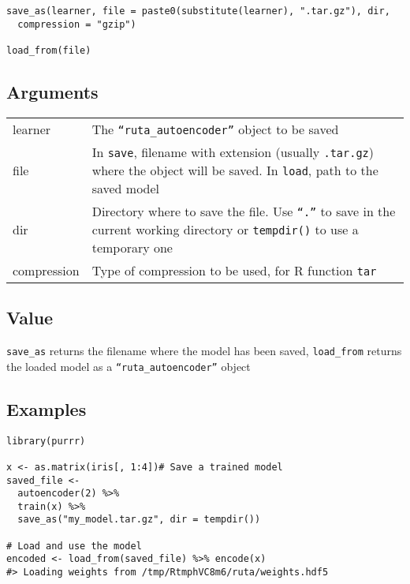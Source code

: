\begin{verbatim}
save_as(learner, file = paste0(substitute(learner), ".tar.gz"), dir,
  compression = "gzip")

load_from(file)
\end{verbatim}

\hypertarget{arguments}{\subsection{\texorpdfstring{\protect\hyperlink{arguments}{}Arguments}{Arguments}}\label{arguments}}

\begin{longtable}[c]{@{}>{\small}p{3cm}>{\raggedright}p{12.5cm}@{}}
\toprule
learner & The \texttt{``ruta\_autoencoder''} object to be
saved\tabularnewline
file & In \texttt{save}, filename with extension (usually
\texttt{.tar.gz}) where the object will be saved. In \texttt{load}, path
to the saved model\tabularnewline
dir & Directory where to save the file. Use \texttt{``.''} to save in the
current working directory or \texttt{tempdir()} to use a temporary
one\tabularnewline
compression & Type of compression to be used, for R function
\texttt{tar}\tabularnewline
\bottomrule
\end{longtable}

\hypertarget{value}{\subsection{\texorpdfstring{\protect\hyperlink{value}{}Value}{Value}}\label{value}}

\texttt{save\_as} returns the filename where the model has been saved,
\texttt{load\_from} returns the loaded model as a
\texttt{``ruta\_autoencoder''} object

\hypertarget{examples}{\subsection{\texorpdfstring{\protect\hyperlink{examples}{}Examples}{Examples}}\label{examples}}

\begin{verbatim}
library(purrr)

x <- as.matrix(iris[, 1:4])# Save a trained model
saved_file <-
  autoencoder(2) %>%
  train(x) %>%
  save_as("my_model.tar.gz", dir = tempdir())

# Load and use the model
encoded <- load_from(saved_file) %>% encode(x)
#> Loading weights from /tmp/RtmphVC8m6/ruta/weights.hdf5
\end{verbatim}
